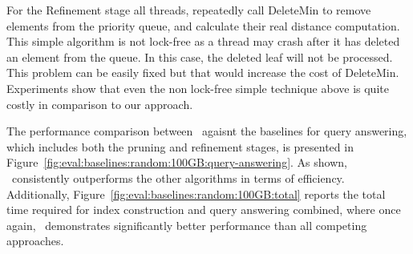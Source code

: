 For the Refinement stage all threads, repeatedly call DeleteMin
to remove elements from the priority queue, and calculate their real distance computation. 
This simple algorithm is not lock-free as a thread may crash after it has
deleted an element from the queue. In this case, the deleted leaf will not be 
processed. This problem can be easily fixed but that would increase the cost 
of DeleteMin. Experiments show that even the non lock-free simple technique
above is quite costly in comparison to our approach.

The performance comparison between \Fresh\ agaisnt the baselines for query 
answering, which includes both the pruning and refinement stages, is presented
in Figure~\ref{fig:eval:baselines:random:100GB:query-answering}.
As shown, \Fresh\ consistently outperforms the other algorithms in terms of
efficiency. Additionally, Figure~\ref{fig:eval:baselines:random:100GB:total}
reports the total time required for index construction and query answering
combined, where once again, \Fresh\ demonstrates significantly better
performance than all competing approaches.

